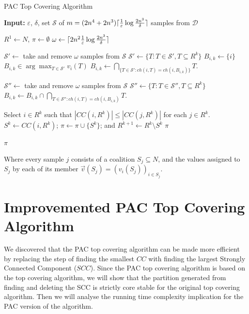 \documentclass[letterpaper]{article} %
\DeclarePairedDelimiter\ceil{\lceil}{\rceil}
\renewcommand{\cal}[1]{\mathcal{#1}}
\newcommand{\eps}{\varepsilon}
\newcommand{\ch}{\mathit{ch}}
\newcommand{\samples}{\omega}
\begin{document}
\begin{algorithm}[htb]
  \caption{PAC Top Covering Algorithm}
  \label{alg:pac_top_covering}
  \textbf{Input:} $\eps$, $\delta$, set $\cal S$ of $m = (2n^4 + 2n^3)\ceil{\frac{1}{\eps}\log\frac{2n^3}{\delta}}$ samples from $\cal D$
  \begin{algorithmic}[1]

  \State $R^1 \gets N$, $\pi \gets \emptyset$
  \State $\samples \gets \ceil{2n^2 \frac{1}{\eps}\log\frac{2n^3}{\delta}}$

    \State $\cal S' \gets$ take and remove $\samples$ samples from $\cal S$
    \State $\cal S' \gets \{T: T \in \cal S', T \subseteq R^k\}$
      \If{$i \notin \bigcup_{X \in \cal S'} X$}
        \State$B_{i,k} \gets \{i\}$
      \Else
        \State $B_{i,k} \in \arg\max_{T \in \cal S'}{v_i(T)}$
        \State $B_{i,k} \gets \underset{\{T \in \cal S' : \ch(i,T) = \ch(i,B_{i,k})\}}{\bigcap} T$.
      \EndIf
    \EndFor

      \State $\cal S'' \gets$ take and remove $\samples$ samples from $\cal S$
      \State $\cal S'' \gets \{T: T \in \cal S'', T \subseteq R^k\}$
        \State $B_{i,k} \gets B_{i,k} \cap \underset{T \in \cal S'' : \ch(i,T) = \ch(i,B_{i,k})}{\bigcap} T$.
      \EndFor
    \EndFor

    \State Select $i\in R^k$ such that $|CC(i,R^k)| \leq |CC(j,R^k)|$ for each $j\in R^k$.
    \State $S^k\leftarrow  CC(i,R^k)$; $\pi \leftarrow  \pi \cup \lbrace S^k \rbrace$;  and $R^{k+1} \leftarrow  R^k \setminus S^k$
      \State \Return $\pi$
    \EndIf
  \EndFor

  \State \Return $\pi$
 \end{algorithmic}
\end{algorithm}

Where every sample $j$ consists of a coalition $S_j \subseteq N$, and the values assigned to $S_j$ by each of its member $\vec{v}(S_j) = (v_i(S_j))_{i \in S_j}$.

\section{Improvemented PAC Top Covering Algorithm}
We discovered that the PAC top covering algorithm can be made more efficient by replacing the step of finding the smallest $CC$ with finding the largest Strongly Connected Component ($SCC$). Since the PAC top covering algorithm is based on the top covering algorithm, we will show that the partition generated from finding and deleting the SCC is strictly core stable for the original top covering algorithm. Then we will analyse the running time complexity implication for the PAC version of the algorithm.
\end{document}
